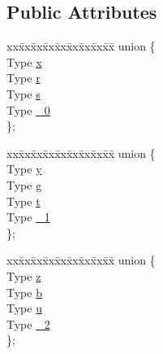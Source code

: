 \subsection*{Public Attributes}
\begin{DoxyCompactItemize}
\item 
\begin{tabbing}
xx\=xx\=xx\=xx\=xx\=xx\=xx\=xx\=xx\=\kill
union \{\\
\>Type \hyperlink{class__vertex4_a5ccbc85f7d9c91ccbef8b2f43f0f4727}{x}\\
\>Type \hyperlink{class__vertex4_a652faf982e13d7d4ad57c7aa5b933272}{r}\\
\>Type \hyperlink{class__vertex4_aa7123465b4037edc64a3e5d1ee13bfad}{s}\\
\>Type \hyperlink{class__vertex4_a09a23b8ca3bc04a31fcd0ed54b81e0ac}{\_0}\\
\}; \\

\end{tabbing}\item 
\begin{tabbing}
xx\=xx\=xx\=xx\=xx\=xx\=xx\=xx\=xx\=\kill
union \{\\
\>Type \hyperlink{class__vertex4_a8adeda89093117902f2d209dc736e7ea}{y}\\
\>Type \hyperlink{class__vertex4_ab797194de019a14415db3d6c67b53286}{g}\\
\>Type \hyperlink{class__vertex4_a4dd7f37de40f133baaadabda56995781}{t}\\
\>Type \hyperlink{class__vertex4_aaf6e97bf9baa67997950774fab3ed2a3}{\_1}\\
\}; \\

\end{tabbing}\item 
\begin{tabbing}
xx\=xx\=xx\=xx\=xx\=xx\=xx\=xx\=xx\=\kill
union \{\\
\>Type \hyperlink{class__vertex4_afe2944665eb26e649287f8b581c91cc5}{z}\\
\>Type \hyperlink{class__vertex4_ae084625b6693f09ee69fa757251b2f9f}{b}\\
\>Type \hyperlink{class__vertex4_a4cbcf7c136545b28651d1dc5fcd0bcbd}{u}\\
\>Type \hyperlink{class__vertex4_a5023a89cb68c2aa2e43b162d1da600ea}{\_2}\\
\}; \\


\end{tabbing}
\end{DoxyCompactItemize}
